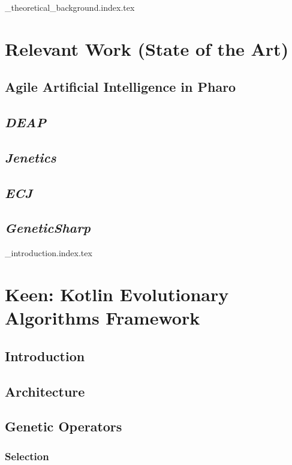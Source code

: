 \pagestyle{fancy}
{_theoretical_background.index.tex}

\chapter{Relevant Work (State of the Art)}
\label{chap:relevant_and_related_work}
  \section{Agile Artificial Intelligence in Pharo}
  \label{sec:agile_artificial_intelligence_in_pharo}
    \Blindtext
  \section{\textit{DEAP}}
  \label{sec:deap}
    \Blindtext
  \section{\textit{Jenetics}}
  \label{sec:jenetics}
    \Blindtext
  \section{\textit{ECJ}}
  \label{sec:ecj}
    \Blindtext
  \section{\textit{GeneticSharp}}
  \label{sec:geneticsharp}
    \Blindtext

{_introduction.index.tex}

\chapter{Keen: Kotlin Evolutionary Algorithms Framework}
\label{chap:keen}
  \section{Introduction}
  \label{sec:introduction}
    \Blindtext
  \section{Architecture}
  \label{sec:architecture}
    \Blindtext
  \section{Genetic Operators}
  \label{sec:keen:operators}
    \subsection{Selection}
    \label{sec:keen:operators:selection}
